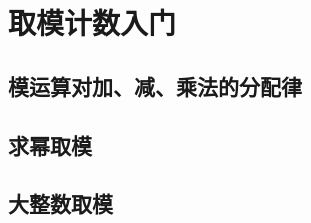 
\section{取模计数入门}
\frame{}%
\subsection{模运算对加、减、乘法的分配律}
\begin{frame}[c]
  \progressnow*
\end{frame}
\frame{}%
\subsection{求幂取模}
\begin{frame}[c]
  \progressnow*
\end{frame}
\frame{}%
\subsection{大整数取模}
\begin{frame}[c]
  \progressnow*
\end{frame}
\frame{}%
